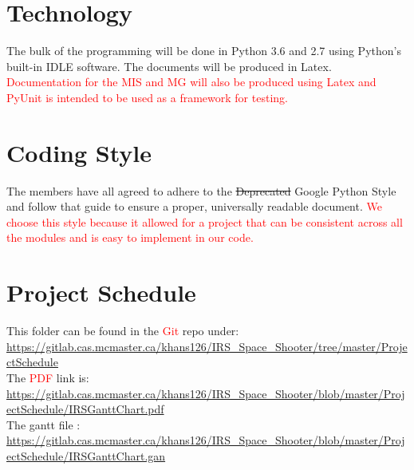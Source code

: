 \documentclass{article}
\begin{document}
\section{Technology}
\smallskip 
The bulk of the programming will be done in Python 3.6 and 2.7 using Python's built-in IDLE software. The documents will be produced in Latex. \textcolor{red}{Documentation for the MIS and MG will also be produced using Latex and PyUnit is intended to be used as a framework for testing.}

\section{Coding Style}
The members have all agreed to adhere to the \sout{Deprecated} Google Python Style and follow that guide to ensure a proper, universally readable document. \textcolor{red}{We choose this style because it allowed for a project that can be consistent across all the modules and is easy to implement in our code.} 

\section{Project Schedule}

This folder can be found in the \textcolor{red}{Git} repo under: 
\\ \url{https://gitlab.cas.mcmaster.ca/khans126/IRS_Space_Shooter/tree/master/ProjectSchedule}
\smallskip
\\The \textcolor{red}{PDF} link is:
\\ \url{https://gitlab.cas.mcmaster.ca/khans126/IRS_Space_Shooter/blob/master/ProjectSchedule/IRSGanttChart.pdf}
\smallskip
\\The gantt file :
\\ \url{https://gitlab.cas.mcmaster.ca/khans126/IRS_Space_Shooter/blob/master/ProjectSchedule/IRSGanttChart.gan}
\end{document}
